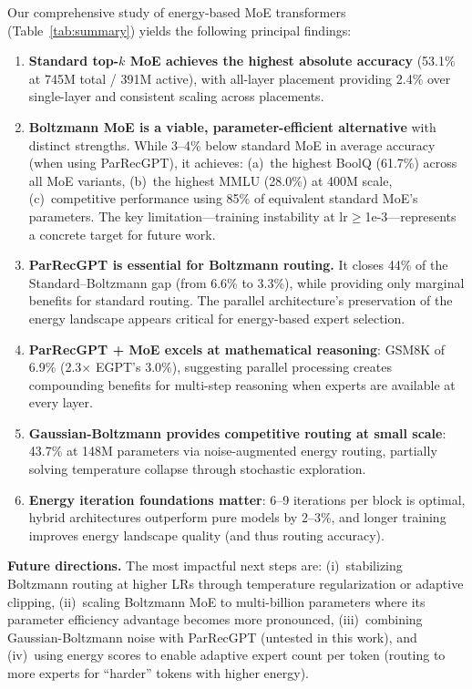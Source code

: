 \documentclass[oneside]{article}
\begin{document}
Our comprehensive study of energy-based MoE transformers (Table~\ref{tab:summary}) yields the following principal findings:

\begin{enumerate}
    \item \textbf{Standard top-$k$ MoE achieves the highest absolute accuracy} (53.1\% at 745M total / 391M active), with all-layer placement providing 2.4\% over single-layer and consistent scaling across placements.

    \item \textbf{Boltzmann MoE is a viable, parameter-efficient alternative} with distinct strengths. While 3--4\% below standard MoE in average accuracy (when using ParRecGPT), it achieves: (a)~the highest BoolQ (61.7\%) across all MoE variants, (b)~the highest MMLU (28.0\%) at 400M scale, (c)~competitive performance using 85\% of equivalent standard MoE's parameters. The key limitation---training instability at lr$\geq$1e-3---represents a concrete target for future work.

    \item \textbf{ParRecGPT is essential for Boltzmann routing.} It closes 44\% of the Standard--Boltzmann gap (from 6.6\% to 3.3\%), while providing only marginal benefits for standard routing. The parallel architecture's preservation of the energy landscape appears critical for energy-based expert selection.

    \item \textbf{ParRecGPT + MoE excels at mathematical reasoning}: GSM8K of 6.9\% (2.3$\times$ EGPT's 3.0\%), suggesting parallel processing creates compounding benefits for multi-step reasoning when experts are available at every layer.

    \item \textbf{Gaussian-Boltzmann provides competitive routing at small scale}: 43.7\% at 148M parameters via noise-augmented energy routing, partially solving temperature collapse through stochastic exploration.

    \item \textbf{Energy iteration foundations matter}: 6--9 iterations per block is optimal, hybrid architectures outperform pure models by 2--3\%, and longer training improves energy landscape quality (and thus routing accuracy).
\end{enumerate}

\textbf{Future directions.} The most impactful next steps are: (i)~stabilizing Boltzmann routing at higher LRs through temperature regularization or adaptive clipping, (ii)~scaling Boltzmann MoE to multi-billion parameters where its parameter efficiency advantage becomes more pronounced, (iii)~combining Gaussian-Boltzmann noise with ParRecGPT (untested in this work), and (iv)~using energy scores to enable adaptive expert count per token (routing to more experts for ``harder'' tokens with higher energy).



\end{document}
